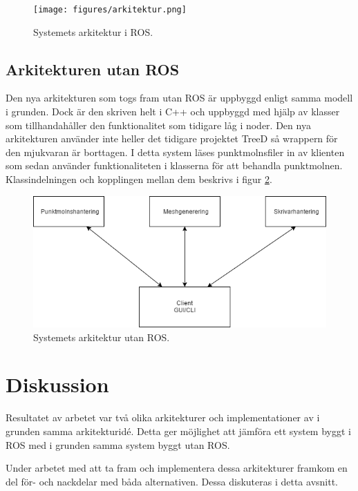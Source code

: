 \begin{figure}[h]
	\centering
	\texttt{[image: figures/arkitektur.png]}
	\caption{Systemets arkitektur i ROS.}
	\label{fig:arkitektur}
\end{figure}

\subsection{Arkitekturen utan ROS}
Den nya arkitekturen som togs fram utan ROS är uppbyggd enligt samma modell i grunden. Dock är den skriven helt i C++ och uppbyggd med hjälp av klasser som tillhandahåller den funktionalitet som tidigare låg i noder. Den nya arkitekturen använder inte heller det tidigare projektet TreeD så wrappern för den mjukvaran är borttagen. I detta system läses punktmolnsfiler in av klienten som sedan använder funktionaliteten i klasserna för att behandla punktmolnen. Klassindelningen och kopplingen mellan dem beskrivs i figur \ref{fig:klasser}.

\begin{figure}[h]
	\centering
	\includegraphics[width=15cm]{figures/klassdiagram.png}
	\caption{Systemets arkitektur utan ROS.}
	\label{fig:klasser}
\end{figure}


\section{Diskussion}
\label{sec:discussion-lundberg}

Resultatet av arbetet var två olika arkitekturer och implementationer av i grunden samma arkitekturidé. Detta ger möjlighet att jämföra ett system byggt i ROS med i grunden samma system byggt utan ROS.

Under arbetet med att ta fram och implementera dessa arkitekturer framkom en del för- och nackdelar med båda alternativen. Dessa diskuteras i detta avsnitt.

